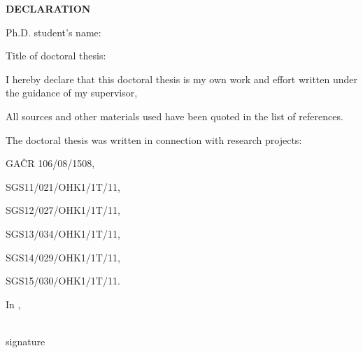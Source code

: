 {\sf
	\vspace{12.5mm}
	\begin{center}
		{\Large\textbf{DECLARATION}\par}
	\end{center}\par
	\vspace{8mm}
	\noindent Ph.D. student's name: \authorName\par
	\vspace{4mm}
	\begin{raggedright}
	\noindent Title of doctoral thesis: \nohyphens{\thesisTitle}\par
	\end{raggedright}
	\vspace{9mm}
	\noindent I hereby declare that this doctoral thesis is my own work and effort written under the guidance of my supervisor, \supervisor\par %
	\noindent All sources and other materials used have been quoted in the list of references.\par
	\vspace{5mm}
	\noindent The doctoral thesis was written in connection with research projects:
		\par
		GAČR 106/08/1508,\par
		SGS11/021/OHK1/1T/11,\par
		SGS12/027/OHK1/1T/11,\par
		SGS13/034/OHK1/1T/11,\par
		SGS14/029/OHK1/1T/11,\par
		SGS15/030/OHK1/1T/11.
	\par
	\vspace{19mm}
	\noindent
	\begin{minipage}[t]{.45\textwidth}
		In \submissionPlace, \submissionDate
	\end{minipage}
	\hfill
	\begin{minipage}[t]{.5\textwidth}
		\centering
		\mydotfill{.3em} \\
		signature
	\end{minipage}
	\par
}





\cleardoublepage
\hypersetup{pageanchor=true}
\setcounter{page}{1}
\pagestyle{main}





